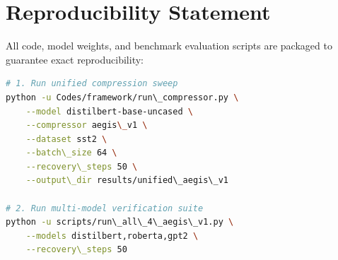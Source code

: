 \section{Reproducibility Statement}
All code, model weights, and benchmark evaluation scripts are packaged to guarantee exact reproducibility:
\begin{lstlisting}[language=bash]
# 1. Run unified compression sweep
python -u Codes/framework/run\_compressor.py \
    --model distilbert-base-uncased \
    --compressor aegis\_v1 \
    --dataset sst2 \
    --batch\_size 64 \
    --recovery\_steps 50 \
    --output\_dir results/unified\_aegis\_v1

# 2. Run multi-model verification suite
python -u scripts/run\_all\_4\_aegis\_v1.py \
    --models distilbert,roberta,gpt2 \
    --recovery\_steps 50
\end{lstlisting}
